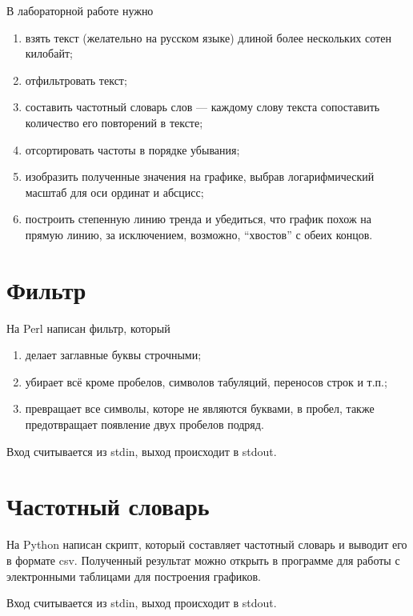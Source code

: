 В лабораторной работе нужно
\begin{enumerate}
  \item
    взять текст (желательно на русском языке)
    длиной более нескольких сотен килобайт;
  \item
    отфильтровать текст;
  \item
    составить частотный словарь слов --- каждому слову текста
    сопоставить количество его повторений в тексте;
  \item
    отсортировать частоты в порядке убывания;
  \item
    изобразить полученные значения на графике,
    выбрав логарифмический масштаб для оси ординат и абсцисс;
  \item
    построить степенную линию тренда и убедиться,
    что график похож на прямую линию, за исключением, возможно,
    ``хвостов'' с обеих концов.
\end{enumerate}

\section{Фильтр}
На Perl написан фильтр, который
\begin{enumerate}
  \item делает заглавные буквы строчными;
  \item убирает всё кроме пробелов, символов табуляций, переносов строк и т.п.;
  \item превращает все символы, которе не являются буквами, в пробел, также
    предотвращает появление двух пробелов подряд.
\end{enumerate}

Вход считывается из stdin, выход происходит в stdout.

\lstset{inputencoding=utf8, extendedchars=\true}


\section{Частотный словарь}
На Python написан скрипт, который составляет частотный словарь
и выводит его в формате csv.
Полученный результат можно открыть в программе для работы
с электронными таблицами для построения графиков.

Вход считывается из stdin, выход происходит в stdout.

\lstset{inputencoding=utf8, extendedchars=\true}


